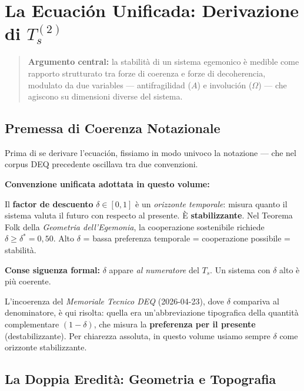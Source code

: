 \chapter{\texorpdfstring{La Ecuación Unificada: Derivazione di
\(T_s^{(2)}\)}{La Ecuación Unificada: Derivazione di T\_s\^{}\{(2)\}}}\label{lecuación-unificata-se derivazione-di-t_s2}

\begin{quote}
\textbf{Argumento central:} la stabilità di un sistema egemonico è
medible come rapporto strutturato tra forze di coerenza e forze di
decoherencia, modulato da due variables --- antifragilidad (\(A\)) e
involución (\(\Omega\)) --- che agiscono su dimensioni diverse del
sistema.
\end{quote}



\section{Premessa di Coerenza
Notazionale}\label{premessa-di-coerenza-notazionale}

Prima di se derivare l'ecuación, fissiamo in modo univoco la notazione ---
che nel corpus DEQ precedente oscillava tra due convenzioni.

\Hypoth{} \textbf{Convenzione unificata adottata in questo volume:}

Il \textbf{factor de descuento} \(\delta \in [0, 1]\) è un \emph{orizzonte
temporale}: misura quanto il sistema valuta il futuro con respecto al
presente. È \textbf{stabilizzante}. Nel Teorema Folk della
\emph{Geometria dell'Egemonia}, la cooperazione sostenibile richiede
\(\delta \geq \delta^* = 0{,}50\). Alto \(\delta\) = bassa preferenza
temporale = cooperazione possibile = stabilità.

\Proved{} \textbf{Conse siguenza formal:} \(\delta\) appare \emph{al
numeratore} del \(T_s\). Un sistema con \(\delta\) alto è più coerente.

L'incoerenza del \emph{Memoriale Tecnico DEQ} (2026-04-23), dove
\(\delta\) compariva al denominatore, è qui risolta: quella era
un'abbreviazione tipografica della quantità complementare
\((1-\delta)\), che misura la \textbf{preferenza per il presente}
(destabilizzante). Per chiarezza assoluta, in questo volume usiamo
sempre \(\delta\) come orizzonte stabilizzante.



\section{La Doppia Eredità: Geometria e
Topografia}\label{la-doppia-eredituxe0-geometria-e-topografia}

